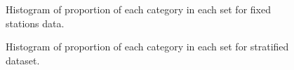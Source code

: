 \documentclass[12pt]{article}\usepackage[]{graphicx}\usepackage[]{color}
\begin{document}
\begin{appendices}
\begin{figure}[htb]
{}

\caption{Histogram of proportion of each category in each set for fixed stations data.}\label{fig:prop-fix}
\end{figure}
\begin{figure}[htb]

{\centering {} 

}

\caption{Histogram of proportion of each category in each set for stratified dataset.}\label{fig:prop-strat}
\end{figure}
\begin{figure}[htb]

{\centering {} 

}
\end{figure}
\end{appendices}
\end{document}

